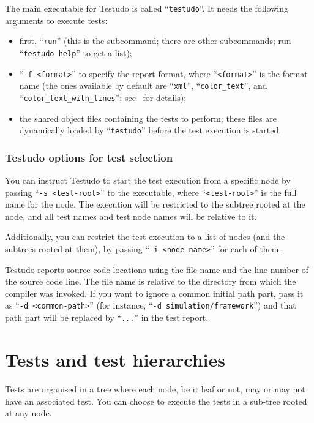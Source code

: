 \documentclass[twoside, a4paper, article]{memoir}
\begin{document}
The main executable for Testudo is called ``\texttt{testudo}''.  It needs the
following arguments to execute tests:
\begin{itemize}
\item first, ``\texttt{run}'' (this is the subcommand; there are other
  subcommands; run ``\texttt{testudo help}'' to get a list);
\item ``\texttt{-f <format>}'' to specify the report format, where
  ``\texttt{<format>}'' is the format name (the ones available by default are
  ``\texttt{xml}'', ``\texttt{color\_text}'', and
  ``\texttt{color\_text\_with\_lines}''; see~ for
  details);
\item the shared object files containing the tests to perform; these files are
  dynamically loaded by ``\texttt{testudo}'' before the test execution is
  started.
\end{itemize}

\subsection{Testudo options for test selection}
\label{sec:testudo-options-test-selection}

You can instruct Testudo to start the test execution from a specific node by
passing ``\texttt{-s <test-root>}'' to the executable, where
``\texttt{<test-root>}'' is the full name for the node.  The execution will be
restricted to the subtree rooted at the node, and all test names and test node
names will be relative to it.

Additionally, you can restrict the test execution to a list of nodes (and the
subtrees rooted at them), by passing ``\texttt{-i <node-name>}'' for each of
them.

Testudo reports source code locations using the file name and the line number
of the source code line.  The file name is relative to the directory from which
the compiler was invoked.  If you want to ignore a common initial path part,
pass it as ``\texttt{-d <common-path>}'' (for instance, ``\texttt{-d
  simulation/framework}'') and that path part will be replaced by
``\texttt{...}''  in the test report.


\chapter{Tests and test hierarchies}
\label{cha:tests-test-hierarchies}

Tests are organised in a tree where each node, be it leaf or not, may or may
not have an associated test.  You can choose to execute the tests in a sub-tree
rooted at any node.
\end{document}
